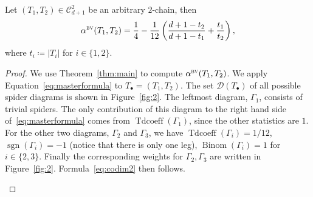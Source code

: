 \documentclass[ALCO,ThmDefs,Unicode,epreuves]{cedram}
\DeclareMathOperator{\Bi}{Binom}
\DeclareMathOperator{\sgn}{sgn}
\DeclareMathOperator{\Tdcoeff}{Tdcoeff}
\newcommand{\D}{{\Gamma}}
\newcommand{\CC}{\mathcal{C}}
\newcommand{\bv}{\alpha^{\textsc{bv}}}
\begin{document}
\begin{prop}
	Let $(T_1,T_2)\in\CC^2_{d+1}$ be an arbitrary $2$-chain, then 
	\begin{equation}\label{eq:codim2}
	\bv(T_1,T_2) = \dfrac{1}{4}-\dfrac{1}{12}\left(\dfrac{d+1-t_2}{d+1-t_1}+\dfrac{t_1}{t_2}\right),
	\end{equation}
	where $t_i\coloneqq |T_i|$ for $i\in\{1,2\}$.
\end{prop}
\begin{proof}
	We use Theorem~\ref{thm:main} to compute $\bv(T_1,T_2)$. We apply Equation~\eqref{eq:masterformula} to $T_\bullet=(T_1,T_2)$. The set $\mathcal{D}(T_\bullet)$ of all possible spider diagrams is shown in Figure~\ref{fig:2}. The leftmost diagram, $\D_1$, consists of trivial spiders. The only contribution of this diagram to the right hand side of~\eqref{eq:masterformula} comes from $\Tdcoeff(\D_1)$, since the other statistics are $1$. For the other two diagrams, $\D_2$ and $\D_3$, we have $\Tdcoeff(\D_i)=1/12$, $\sgn(\D_i)=-1$ (notice that there is only one leg), $\Bi(\D_i)=1$ for $i\in\{2,3\}$. Finally the corresponding weights for $\D_2,\D_3$ are written in Figure~\ref{fig:2}. Formula~\eqref{eq:codim2} then follows. 
	\begin{figure}[ht]
		\centering
\end{figure}
\end{proof}
\end{document}
